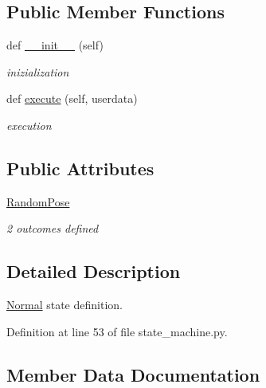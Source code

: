 \subsection*{Public Member Functions}
\begin{DoxyCompactItemize}
\item 
\mbox{\label{classstate__machine_1_1Normal_acdbc35a37d0350d7805a628048bc3bed}} 
def \hyperlink{classstate__machine_1_1Normal_acdbc35a37d0350d7805a628048bc3bed}{\+\_\+\+\_\+init\+\_\+\+\_\+} (self)
\begin{DoxyCompactList}\small\item\em inizialization \end{DoxyCompactList}\item 
\mbox{\label{classstate__machine_1_1Normal_a2930df5f4890ec4b47b2a8e18f9bff08}} 
def \hyperlink{classstate__machine_1_1Normal_a2930df5f4890ec4b47b2a8e18f9bff08}{execute} (self, userdata)
\begin{DoxyCompactList}\small\item\em execution \end{DoxyCompactList}\end{DoxyCompactItemize}
\subsection*{Public Attributes}
\begin{DoxyCompactItemize}
\item 
\hyperlink{classstate__machine_1_1Normal_addf28bcb55a3e1f6bdb118850e164c03}{Random\+Pose}
\begin{DoxyCompactList}\small\item\em 2 outcomes defined \end{DoxyCompactList}\end{DoxyCompactItemize}


\subsection{Detailed Description}
\hyperlink{classstate__machine_1_1Normal}{Normal} state definition. 

Definition at line 53 of file state\+\_\+machine.\+py.



\subsection{Member Data Documentation}
\mbox{\label{classstate__machine_1_1Normal_addf28bcb55a3e1f6bdb118850e164c03}} 
